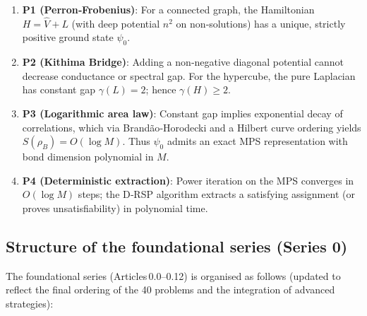 \documentclass[11pt,a4paper]{article}
\begin{document}
\begin{enumerate}
\item \textbf{P1 (Perron‑Frobenius)}: For a connected graph, the Hamiltonian \(H = \hat{V} + L\) (with deep potential \(n^2\) on non‑solutions) has a unique, strictly positive ground state \(\psi_0\).
\item \textbf{P2 (Kithima Bridge)}: Adding a non‑negative diagonal potential cannot decrease conductance or spectral gap. For the hypercube, the pure Laplacian has constant gap \(\gamma(L) = 2\); hence \(\gamma(H) \geq 2\).
\item \textbf{P3 (Logarithmic area law)}: Constant gap implies exponential decay of correlations, which via Brandão‑Horodecki and a Hilbert curve ordering yields \(S(\rho_B) = O(\log M)\). Thus \(\psi_0\) admits an exact MPS representation with bond dimension polynomial in \(M\).
\item \textbf{P4 (Deterministic extraction)}: Power iteration on the MPS converges in \(O(\log M)\) steps; the D‑RSP algorithm extracts a satisfying assignment (or proves unsatisfiability) in polynomial time.
\end{enumerate}

\subsection{Structure of the foundational series (Series 0)}

The foundational series (Articles 0.0–0.12) is organised as follows (updated to reflect the final ordering of the 40 problems and the integration of advanced strategies):
\end{document}
